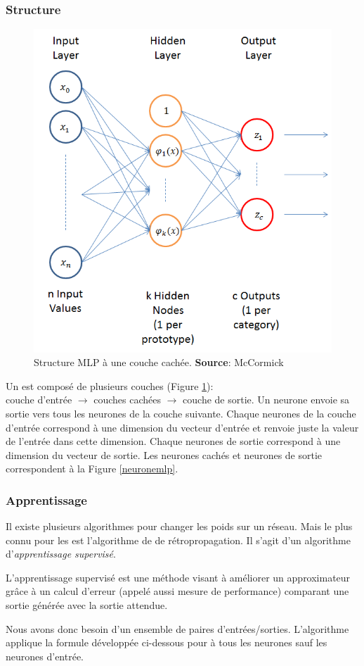 \documentclass[12pt,a4paper,oneside, titlepage]{article}
\begin{document}
\subsubsection*{Structure}
\begin{figure}
 \centering
 \includegraphics[scale=0.5]{../figures/nnstruct.png}
 \caption{Structure MLP à une couche cachée. \textbf{Source}: McCormick\cite{RBFtuto}}
 \label{structuremlp}
\end{figure}
Un \mlp est composé de plusieurs couches (Figure \ref{structuremlp}):\\
couche d'entrée $\rightarrow$ couches cachées $\rightarrow$ couche de sortie.
Un neurone envoie sa sortie vers tous les neurones de la couche suivante.
Chaque neurones de la couche d'entrée correspond à une dimension du vecteur d'entrée et renvoie juste la valeur de l'entrée dans cette dimension.
Chaque neurones de sortie correspond à une dimension du vecteur de sortie.
Les neurones cachés et neurones de sortie correspondent à la Figure \ref{neuronemlp}.
\subsubsection*{Apprentissage}
Il existe plusieurs algorithmes pour changer les poids sur un réseau. Mais le plus connu pour les \mlp est l'algorithme de de rétropropagation.\cite{Haykin,Gauthier}
Il s'agit d'un algorithme d'\emph{apprentissage supervisé}.
\begin{definition}
L'apprentissage supervisé est une méthode visant à améliorer un approximateur grâce à un calcul d'erreur (appelé aussi mesure de performance\cite{Gauthier}) comparant une sortie générée avec la sortie attendue.
\end{definition}
Nous avons donc besoin d'un ensemble de paires d'entrées/sorties. L'algorithme applique la formule développée ci-dessous pour à tous les neurones sauf les neurones d'entrée.\\
\end{document}
